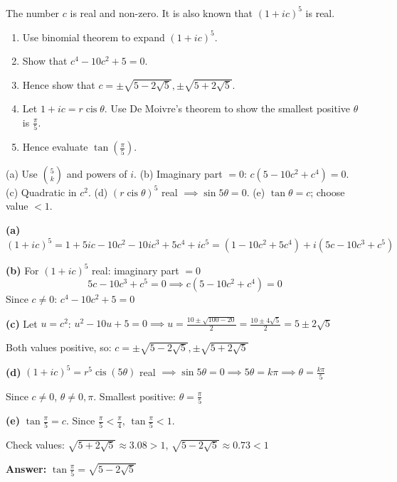 
\begin{problem}
The number $c$ is real and non-zero. It is also known that $(1 + ic)^5$ is real.
\begin{enumerate}
    \item Use binomial theorem to expand $(1 + ic)^5$.
    \item Show that $c^4 - 10c^2 + 5 = 0$.
    \item Hence show that $c = \pm\sqrt{5 - 2\sqrt{5}}, \pm\sqrt{5 + 2\sqrt{5}}$.
    \item Let $1 + ic = r\operatorname{cis} \theta$. Use De Moivre's theorem to show the smallest positive $\theta$ is $\frac{\pi}{5}$.
    \item Hence evaluate $\tan\left(\frac{\pi}{5}\right)$.
\end{enumerate}
\end{problem}

\vspace{0.5cm}
\begin{hintbox}
(a) Use $\binom{5}{k}$ and powers of $i$. (b) Imaginary part $=0$: $c(5-10c^2+c^4)=0$. (c) Quadratic in $c^2$. (d) $(r\operatorname{cis}\theta)^5$ real $\implies \sin 5\theta=0$. (e) $\tan\theta = c$; choose value $<1$.
\end{hintbox}

\begin{solution}
\textbf{(a)} $(1+ic)^5 = 1 + 5ic - 10c^2 - 10ic^3 + 5c^4 + ic^5 = (1-10c^2+5c^4) + i(5c-10c^3+c^5)$

\textbf{(b)} For $(1+ic)^5$ real: imaginary part $= 0$
$$
5c - 10c^3 + c^5 = 0 \implies c(5-10c^2+c^4)=0
$$
Since $c \neq 0$: $c^4-10c^2+5=0$

\textbf{(c)} Let $u=c^2$: $u^2-10u+5=0 \implies u = \frac{10\pm\sqrt{100-20}}{2} = \frac{10\pm 4\sqrt{5}}{2} = 5\pm 2\sqrt{5}$

Both values positive, so: $c = \pm\sqrt{5-2\sqrt{5}}, \pm\sqrt{5+2\sqrt{5}}$

\textbf{(d)} $(1+ic)^5 = r^5\operatorname{cis}(5\theta)$ real $\implies \sin 5\theta = 0 \implies 5\theta = k\pi \implies \theta = \frac{k\pi}{5}$

Since $c \neq 0$, $\theta \neq 0, \pi$. Smallest positive: $\theta = \frac{\pi}{5}$

\textbf{(e)} $\tan\frac{\pi}{5} = c$. Since $\frac{\pi}{5} < \frac{\pi}{4}$, $\tan\frac{\pi}{5} < 1$.

Check values: $\sqrt{5+2\sqrt{5}} \approx 3.08 > 1$, $\sqrt{5-2\sqrt{5}} \approx 0.73 < 1$

\textbf{Answer:} $\tan\frac{\pi}{5} = \sqrt{5-2\sqrt{5}}$
\end{solution}

